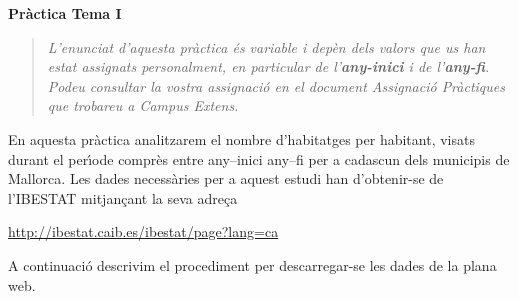 \documentclass[11pt]{article}
\begin{document}
\vspace{0.3cm}
\noindent
\textbf{Pr\`actica Tema I}

\vspace{0.3cm}


\begin{quotation}
\textit{L'enunciat d'aquesta pr\`actica \'es variable i dep\`en dels valors que us han estat assignats personalment, en particular de l'\textbf{any-inici} i
de l'\textbf{any-fi}. Podeu consultar la vostra assignaci\'o en el document \textit{Assignaci\'o Pr\`actiques} que trobareu a Campus Extens.}
\end{quotation}

En aquesta pr\`actica analitzarem el nombre d'habitatges per habitant, visats durant el per\'{\i}ode compr\`es entre any--inici any--fi per a cadascun dels municipis de Mallorca. Les dades necess\`aries per a aquest estudi han d'obtenir-se de l'IBESTAT mitjan\c{c}ant la seva adre\c{c}a 
\begin{center}
\url{http://ibestat.caib.es/ibestat/page?lang=ca}
\end{center}
A continuaci\'o descrivim el procediment per descarregar-se les dades de la plana web.
\end{document}
